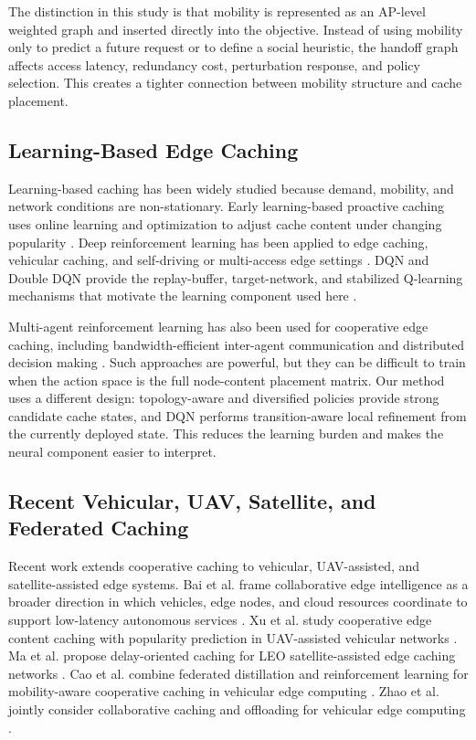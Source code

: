 The distinction in this study is that mobility is represented as an AP-level weighted graph and inserted directly into the objective. Instead of using mobility only to predict a future request or to define a social heuristic, the handoff graph affects access latency, redundancy cost, perturbation response, and policy selection. This creates a tighter connection between mobility structure and cache placement.

\subsection{Learning-Based Edge Caching}

Learning-based caching has been widely studied because demand, mobility, and network conditions are non-stationary. Early learning-based proactive caching uses online learning and optimization to adjust cache content under changing popularity \cite{Blasco2014}. Deep reinforcement learning has been applied to edge caching, vehicular caching, and self-driving or multi-access edge settings \cite{Chen2021TMC,Ndikumana2020,zhou2023distributed}. DQN and Double DQN provide the replay-buffer, target-network, and stabilized Q-learning mechanisms that motivate the learning component used here \cite{mnih2015dqn,vanhasselt2016double}.

Multi-agent reinforcement learning has also been used for cooperative edge caching, including bandwidth-efficient inter-agent communication and distributed decision making \cite{Min2020MARL,zhou2023distributed}. Such approaches are powerful, but they can be difficult to train when the action space is the full node-content placement matrix. Our method uses a different design: topology-aware and diversified policies provide strong candidate cache states, and DQN performs transition-aware local refinement from the currently deployed state. This reduces the learning burden and makes the neural component easier to interpret.

\subsection{Recent Vehicular, UAV, Satellite, and Federated Caching}

Recent work extends cooperative caching to vehicular, UAV-assisted, and satellite-assisted edge systems. Bai et al. frame collaborative edge intelligence as a broader direction in which vehicles, edge nodes, and cloud resources coordinate to support low-latency autonomous services \cite{bai2025collaborative}. Xu et al. study cooperative edge content caching with popularity prediction in UAV-assisted vehicular networks \cite{xu2026cooperative}. Ma et al. propose delay-oriented caching for LEO satellite-assisted edge caching networks \cite{ma2025delay}. Cao et al. combine federated distillation and reinforcement learning for mobility-aware cooperative caching in vehicular edge computing \cite{cao2025}. Zhao et al. jointly consider collaborative caching and offloading for vehicular edge computing \cite{zhao2026collaborative}.

